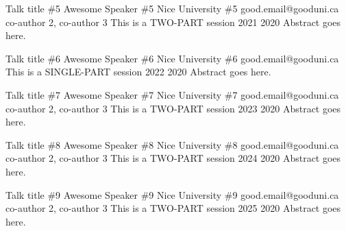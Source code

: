 \begin{talk}
	{Talk title \#5}%
	{Awesome Speaker \#5}%
	{Nice University \#5}%
	{good.email@gooduni.ca}%
	{co-author 2, co-author 3}%
	{This is a TWO-PART session}%
	{}%
	{2021}%
	{2020}%
	Abstract goes here.
\end{talk}

\begin{talk}
	{Talk title \#6}%
	{Awesome Speaker \#6}%
	{Nice University \#6}%
	{good.email@gooduni.ca}%
	{}%
	{This is a SINGLE-PART session}%
	{}%
	{2022}%
	{2020}%
	Abstract goes here.
\end{talk}

\begin{talk}
	{Talk title \#7}%
	{Awesome Speaker \#7}%
	{Nice University \#7}%
	{good.email@gooduni.ca}%
	{co-author 2, co-author 3}%
	{This is a TWO-PART session}%
	{}%
	{2023}%
	{2020}%
	Abstract goes here.
\end{talk}

\begin{talk}
	{Talk title \#8}%
	{Awesome Speaker \#8}%
	{Nice University \#8}%
	{good.email@gooduni.ca}%
	{co-author 2, co-author 3}%
	{This is a TWO-PART session}%
	{}%
	{2024}%
	{2020}%
	Abstract goes here.
\end{talk}

\begin{talk}
	{Talk title \#9}%
	{Awesome Speaker \#9}%
	{Nice University \#9}%
	{good.email@gooduni.ca}%
	{co-author 2, co-author 3}%
	{This is a TWO-PART session}%
	{}%
	{2025}%
	{2020}%
	Abstract goes here.
\end{talk}

